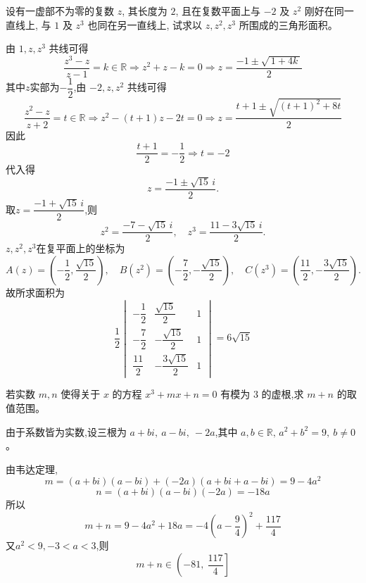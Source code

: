 \begin{questions}
    \question 设有一虚部不为零的复数 $z$, 其长度为 $2$, 且在复数平面上与 $-2$ 及 $z^2$ 刚好在同一直线上, 与 $1$ 及 $z^3$ 也同在另一直线上, 试求以 $z,z^2,z^3$ 所围成的三角形面积。
    \begin{solution}
        由 $1,z,z^3$ 共线可得
        \[
        \frac{z^3-z}{z-1}=k \in \mathbb R \Rightarrow z^2+z-k=0 \Rightarrow z=\frac{-1\pm \sqrt{\,1+4k\,}}{2}
        \]
        其中$z$实部为$-\dfrac{1}{2}$,由 $-2,z,z^2$ 共线可得
        \[
        \frac{z^2-z}{z+2}=t \in \mathbb R
        \Rightarrow z^2-(t+1)z-2t=0
        \Rightarrow z=\frac{t+1\pm \sqrt{(t+1)^2+8t}}{2}
        \]
        因此
        \[
        \frac{t+1}{2}=-\frac{1}{2}\Rightarrow t=-2
        \]
        代入得
        \[
        z=\frac{-1\pm \sqrt{15}\, i}{2}.
        \]
        取$z=\dfrac{-1+\sqrt{15}\, i}{2}$,则
        \[
        z^2=\frac{-7-\sqrt{15}\, i}{2},\quad
        z^3=\frac{11-3\sqrt{15}\, i}{2}.
        \]
        $z,z^2,z^3$在复平面上的坐标为
        \[
        A(z)=\left(-\frac12,\frac{\sqrt{15}}{2}\right),\quad
        B(z^2)=\left(-\frac72,-\frac{\sqrt{15}}{2}\right),\quad
        C(z^3)=\left(\frac{11}{2},-\frac{3\sqrt{15}}{2}\right).
        \]
        故所求面积为
        \[
        \frac{1}{2}
        \begin{vmatrix}
        -\dfrac12 & \dfrac{\sqrt{15}}{2} & 1\\[6pt]
        -\dfrac72 & -\dfrac{\sqrt{15}}{2} & 1\\[6pt]
        \dfrac{11}{2} & -\dfrac{3\sqrt{15}}{2} & 1
        \end{vmatrix}
        =6\sqrt{15}
        \]
    \end{solution}

    \question 若实数 $m,n$ 使得关于 $x$ 的方程 $x^3 + mx + n = 0$ 有模为 $3$ 的虚根,求 $m+n$ 的取值范围。
    \begin{solution}
        由于系数皆为实数,设三根为 $a + bi,\ a - bi,\ -2a$,其中 $a,b \in \mathbb{R},\,a^2 + b^2 = 9,\ b \ne 0$。
        
        由韦达定理,
        \[
        m = (a + bi)(a - bi) + (-2a)(a + bi + a - bi)
        = 9 - 4a^2
        \]
        \[
        n=(a + bi)(a - bi)(-2a)= -18a 
        \]
        所以
        \[
        m + n = 9 - 4a^2 + 18a = -4\left(a - \dfrac{9}{4} \right)^2 + \dfrac{117}{4}
        \]
        又$a^2<9,-3<a<3$,则\[
        m+n \in \left(-81,\ \dfrac{117}{4}\right]
        \]
    \end{solution}


\end{questions}
